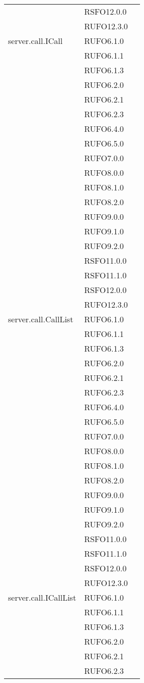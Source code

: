 \begin{center}
\begin{longtable}{lp{}l}
 & RSFO12.0.0 \\
 & RUFO12.3.0 \\
server.call.ICall  & RUFO6.1.0 \\
 & RUFO6.1.1 \\
 & RUFO6.1.3 \\
 & RUFO6.2.0 \\
 & RUFO6.2.1 \\
 & RUFO6.2.3 \\
 & RUFO6.4.0 \\
 & RUFO6.5.0 \\
 & RUFO7.0.0 \\
 & RUFO8.0.0 \\
 & RUFO8.1.0 \\
 & RUFO8.2.0 \\
 & RUFO9.0.0 \\
 & RUFO9.1.0 \\
 & RUFO9.2.0 \\
 & RSFO11.0.0 \\
 & RSFO11.1.0 \\
 & RSFO12.0.0 \\
 & RUFO12.3.0 \\
server.call.CallList  & RUFO6.1.0 \\
 & RUFO6.1.1 \\
 & RUFO6.1.3 \\
 & RUFO6.2.0 \\
 & RUFO6.2.1 \\
 & RUFO6.2.3 \\
 & RUFO6.4.0 \\
 & RUFO6.5.0 \\
 & RUFO7.0.0 \\
 & RUFO8.0.0 \\
 & RUFO8.1.0 \\
 & RUFO8.2.0 \\
 & RUFO9.0.0 \\
 & RUFO9.1.0 \\
 & RUFO9.2.0 \\
 & RSFO11.0.0 \\
 & RSFO11.1.0 \\
 & RSFO12.0.0 \\
 & RUFO12.3.0 \\
server.call.ICallList  & RUFO6.1.0 \\
 & RUFO6.1.1 \\
 & RUFO6.1.3 \\
 & RUFO6.2.0 \\
 & RUFO6.2.1 \\
 & RUFO6.2.3 \\

\end{longtable}
\end{center}
